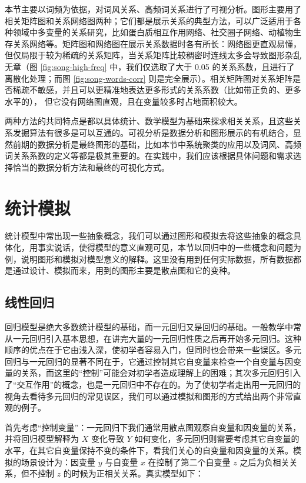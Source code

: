 \documentclass[
  b5paper,
  UTF8,twoside]{book}
\begin{document}
本节主要以词频为依据，对词风关系、高频词关系进行了可视分析。图形主要用了相关矩阵图和关系网络图两种；它们都是展示关系的典型方法，可以广泛适用于各种领域中多变量的关系研究，比如蛋白质相互作用网络、社交圈子网络、动植物生存关系网络等。矩阵图和网络图在展示关系数据时各有所长：网络图更直观易懂，但仅局限于较为稀疏的关系矩阵，当关系矩阵比较稠密时连线太多会导致图形杂乱无章（图 \ref{fig:song-high-freq} 中，我们仅选取了大于 0.05 的关系系数，且进行了离散化处理；而图 \ref{fig:song-words-corr} 则是完全展示）。相关矩阵图对关系矩阵是否稀疏不敏感，并且可以更精准地表达更多形式的关系系数（比如带正负的、更多水平的）， 但它没有网络图直观，且在变量较多时占地面积较大。

两种方法的共同特点是都以具体统计、数学模型为基础来探求相关关系，且这些关系发掘算法有很多是可以互通的。可视分析是数据分析和图形展示的有机结合，显然前期的数据分析是最终图形的基础，比如本节中系统聚类的应用以及词风、高频词关系系数的定义等都是极其重要的。在实践中，我们应该根据具体问题和需求选择恰当的数据分析方法和最终的可视化方式。

\section{统计模拟}\label{sec:simulations}

统计模型中常出现一些抽象概念，我们可以通过图形和模拟去将这些抽象的概念具体化，用事实说话，使得模型的意义直观可见，本节以回归中的一些概念和问题为例，说明图形和模拟对模型意义的解释。这里没有用到任何实际数据，所有数据都是通过设计、模拟而来，用到的图形主要是散点图和它的变种。

\subsection{线性回归}\label{ux7ebfux6027ux56deux5f52}

回归模型是绝大多数统计模型的基础，而一元回归又是回归的基础。一般教学中常从一元回归引入基本思想，在讲完大量的一元回归性质之后再开始多元回归。这种顺序的优点在于它由浅入深，使初学者容易入门，但同时也会带来一些误区。多元回归与一元回归的显著不同在于，它通过控制其它自变量来检查一个自变量与因变量的关系，而这里的``控制''可能会对初学者造成理解上的困难；其次多元回归引入了``交互作用''的概念，也是一元回归中不存在的。为了使初学者走出用一元回归的视角去看待多元回归的常见误区，我们可以通过模拟和图形的方式给出两个非常直观的例子。

首先考虑``控制变量''：一元回归下我们通常用散点图观察自变量和因变量的关系，并将回归模型解释为 \(X\) 变化导致 \(Y\) 如何变化，多元回归则需要考虑其它自变量的水平，在其它自变量保持不变的条件下，看我们关心的自变量和因变量的关系。模拟的场景设计为：因变量 \(y\) 与自变量 \(x\) 在控制了第二个自变量 \(z\) 之后为负相关关系，但不控制 \(z\) 的时候为正相关关系。真实模型如下：
\end{document}
